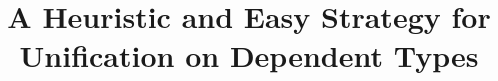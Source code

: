 \documentclass[preprint, nocopyrightspace]{llncs}
\begin{document}
\setlength{\pdfpageheight}{\paperheight}
\setlength{\pdfpagewidth}{\paperwidth}

\title{A Heuristic and Easy Strategy for Unification on Dependent Types}
\maketitle










\appendix

\end{document}

